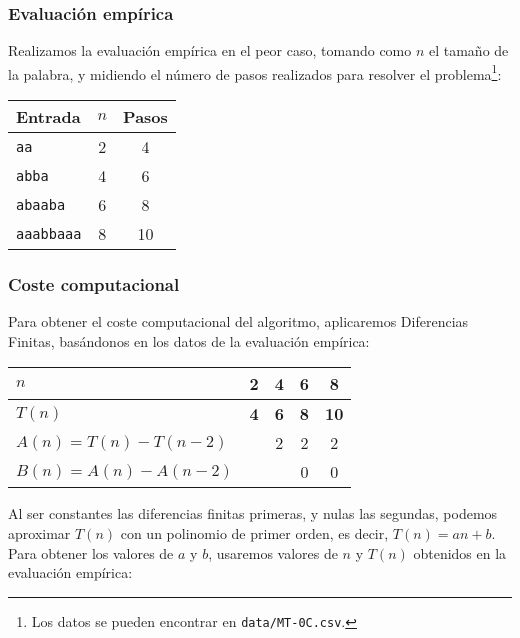 \subsubsection*{Evaluación empírica}
Realizamos la evaluación empírica en el peor caso, tomando como $n$ el tamaño de la palabra, y midiendo el número de pasos realizados para resolver el problema\footnote{Los datos se pueden encontrar en \texttt{data/MT-0C.csv}.}:

\begin{table}[h]
    \centering
    \begin{tabular}{lcc}
        Entrada & $n$ & Pasos \\
        \hline
        \texttt{aa}             & 2  & 4 \\
        \texttt{abba}           & 4  & 6 \\
        \texttt{abaaba}         & 6  & 8 \\
        \texttt{aaabbaaa}       & 8  & 10 \\
    \end{tabular}
\end{table}

\subsubsection*{Coste computacional}
Para obtener el coste computacional del algoritmo, aplicaremos Diferencias Finitas, basándonos en los datos de la evaluación empírica:

\begin{table}[H]
    \centering
    \begin{tabular}{|l|c|c|c|c|}
        \hline
        $n$ & \textbf{2} & \textbf{4} & \textbf{6} & \textbf{8} \\ \hline
        $T(n)$ & \textbf{4} & \textbf{6} & \textbf{8} & \textbf{10} \\ \hline
        \hline
        $A(n) = T(n) - T(n-2)$ &   & 2 & 2 & 2 \\ \hline
        $B(n) = A(n) - A(n-2)$ &   &   & 0 & 0 \\ \hline
    \end{tabular}
    \label{tab:0C}
\end{table}

Al ser constantes las diferencias finitas primeras, y nulas las segundas, podemos aproximar $T(n)$ con un polinomio de primer orden, es decir, $T(n) = an + b$.\\

Para obtener los valores de $a$ y $b$, usaremos valores de $n$ y $T(n)$ obtenidos en la evaluación empírica:


